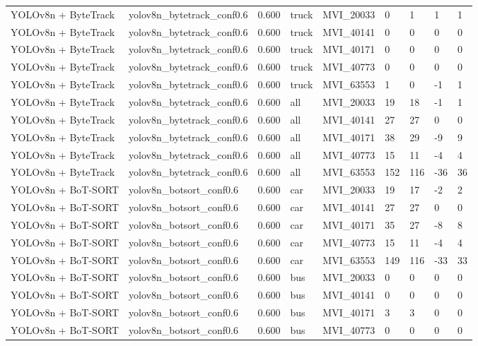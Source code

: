 \begin{tabular}{lllllllll}
YOLOv8n + ByteTrack & yolov8n\_bytetrack\_conf0.6 & 0.600 & truck & MVI\_20033 & 0 & 1 & 1 & 1 \\
YOLOv8n + ByteTrack & yolov8n\_bytetrack\_conf0.6 & 0.600 & truck & MVI\_40141 & 0 & 0 & 0 & 0 \\
YOLOv8n + ByteTrack & yolov8n\_bytetrack\_conf0.6 & 0.600 & truck & MVI\_40171 & 0 & 0 & 0 & 0 \\
YOLOv8n + ByteTrack & yolov8n\_bytetrack\_conf0.6 & 0.600 & truck & MVI\_40773 & 0 & 0 & 0 & 0 \\
YOLOv8n + ByteTrack & yolov8n\_bytetrack\_conf0.6 & 0.600 & truck & MVI\_63553 & 1 & 0 & -1 & 1 \\
YOLOv8n + ByteTrack & yolov8n\_bytetrack\_conf0.6 & 0.600 & all & MVI\_20033 & 19 & 18 & -1 & 1 \\
YOLOv8n + ByteTrack & yolov8n\_bytetrack\_conf0.6 & 0.600 & all & MVI\_40141 & 27 & 27 & 0 & 0 \\
YOLOv8n + ByteTrack & yolov8n\_bytetrack\_conf0.6 & 0.600 & all & MVI\_40171 & 38 & 29 & -9 & 9 \\
YOLOv8n + ByteTrack & yolov8n\_bytetrack\_conf0.6 & 0.600 & all & MVI\_40773 & 15 & 11 & -4 & 4 \\
YOLOv8n + ByteTrack & yolov8n\_bytetrack\_conf0.6 & 0.600 & all & MVI\_63553 & 152 & 116 & -36 & 36 \\
YOLOv8n + BoT-SORT & yolov8n\_botsort\_conf0.6 & 0.600 & car & MVI\_20033 & 19 & 17 & -2 & 2 \\
YOLOv8n + BoT-SORT & yolov8n\_botsort\_conf0.6 & 0.600 & car & MVI\_40141 & 27 & 27 & 0 & 0 \\
YOLOv8n + BoT-SORT & yolov8n\_botsort\_conf0.6 & 0.600 & car & MVI\_40171 & 35 & 27 & -8 & 8 \\
YOLOv8n + BoT-SORT & yolov8n\_botsort\_conf0.6 & 0.600 & car & MVI\_40773 & 15 & 11 & -4 & 4 \\
YOLOv8n + BoT-SORT & yolov8n\_botsort\_conf0.6 & 0.600 & car & MVI\_63553 & 149 & 116 & -33 & 33 \\
YOLOv8n + BoT-SORT & yolov8n\_botsort\_conf0.6 & 0.600 & bus & MVI\_20033 & 0 & 0 & 0 & 0 \\
YOLOv8n + BoT-SORT & yolov8n\_botsort\_conf0.6 & 0.600 & bus & MVI\_40141 & 0 & 0 & 0 & 0 \\
YOLOv8n + BoT-SORT & yolov8n\_botsort\_conf0.6 & 0.600 & bus & MVI\_40171 & 3 & 3 & 0 & 0 \\
YOLOv8n + BoT-SORT & yolov8n\_botsort\_conf0.6 & 0.600 & bus & MVI\_40773 & 0 & 0 & 0 & 0 \\

\end{tabular}

